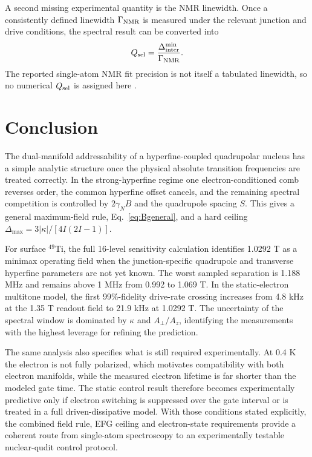 \documentclass[11pt]{article}
\newcommand{\Ti}{$^{49}$Ti}
\newcommand{\DeltaInter}{\Delta_{\mathrm{inter}}^{\min}}
\begin{document}
A second missing experimental quantity is the NMR linewidth. Once a consistently defined linewidth $\Gamma_{\rm NMR}$ is measured under the relevant junction and drive conditions, the spectral result can be converted into
\begin{equation}
Q_{\rm sel}=\frac{\DeltaInter}{\Gamma_{\rm NMR}}.
\end{equation}
The reported single-atom NMR fit precision is not itself a tabulated linewidth, so no numerical $Q_{\rm sel}$ is assigned here \cite{vennema2025}.

\section{Conclusion}
The dual-manifold addressability of a hyperfine-coupled quadrupolar nucleus has a simple analytic structure once the physical absolute transition frequencies are treated correctly. In the strong-hyperfine regime one electron-conditioned comb reverses order, the common hyperfine offset cancels, and the remaining spectral competition is controlled by $2\gamma_NB$ and the quadrupole spacing $S$. This gives a general maximum-field rule, Eq.~\eqref{eq:Bgeneral}, and a hard ceiling $\Delta_{\max}=3|\kappa|/[4I(2I-1)]$.

For surface \Ti, the full 16-level sensitivity calculation identifies 1.0292 T as a minimax operating field when the junction-specific quadrupole and transverse hyperfine parameters are not yet known. The worst sampled separation is 1.188 MHz and remains above 1 MHz from 0.992 to 1.069 T. In the static-electron multitone model, the first 99\%-fidelity drive-rate crossing increases from 4.8 kHz at the 1.35 T readout field to 21.9 kHz at 1.0292 T. The uncertainty of the spectral window is dominated by $\kappa$ and $A_\perp/A_z$, identifying the measurements with the highest leverage for refining the prediction.

The same analysis also specifies what is still required experimentally. At 0.4 K the electron is not fully polarized, which motivates compatibility with both electron manifolds, while the measured electron lifetime is far shorter than the modeled gate time. The static control result therefore becomes experimentally predictive only if electron switching is suppressed over the gate interval or is treated in a full driven-dissipative model. With those conditions stated explicitly, the combined field rule, EFG ceiling and electron-state requirements provide a coherent route from single-atom spectroscopy to an experimentally testable nuclear-qudit control protocol.
\end{document}
